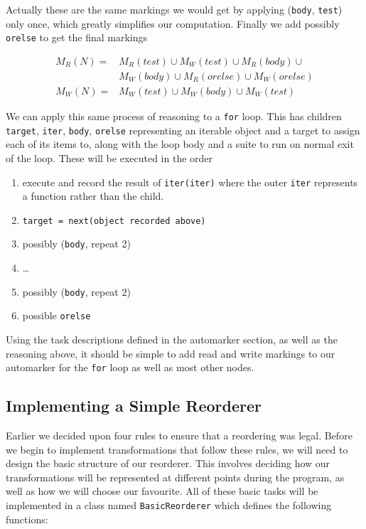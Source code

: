 \documentclass{report}
\begin{document}
Actually these are the same markings we would get by applying (\texttt{body}, \texttt{test}) only once, which greatly simplifies our computation. Finally we
add possibly \texttt{orelse} to get the final markings

\begin{align*}
M_R(N) =& M_R(test) \cup M_W(test) \cup M_R(body) \cup \\
        & M_W(body) \cup M_R(orelse) \cup M_W(orelse) \\
M_W(N) =& M_W(test) \cup M_W(body) \cup M_W(test)
\end{align*}

We can apply this same process of reasoning to a \texttt{for} loop. This has children \texttt{target}, \texttt{iter}, \texttt{body}, \texttt{orelse}
representing an iterable object and a target to assign each of its items to, along with the loop body and a suite to run on normal exit of the loop.
These will be executed in the order

\begin{enumerate}
\item execute and record the result of \texttt{iter(iter)} where the outer \texttt{iter} represents a function rather than the child.
\item \texttt{target = next(object recorded above)}
\item possibly (\texttt{body}, repeat 2)
\item \ldots
\item possibly (\texttt{body}, repeat 2)
\item possible \texttt{orelse}
\end{enumerate}

Using the task descriptions defined in the automarker section, as well as the reasoning above, it should be simple to add read and write markings to
our automarker for the \texttt{for} loop as well as most other nodes.

\subsection{Implementing a Simple Reorderer}

Earlier we decided upon four rules to ensure that a reordering was legal. Before we begin to implement transformations that follow these rules, we
will need to design the basic structure of our reorderer. This involves deciding how our transformations will be represented at different points
during the program, as well as how we will choose our favourite. All of these basic tasks will be implemented in a class named \texttt{BasicReorderer}
which defines the following functions:
\end{document}
